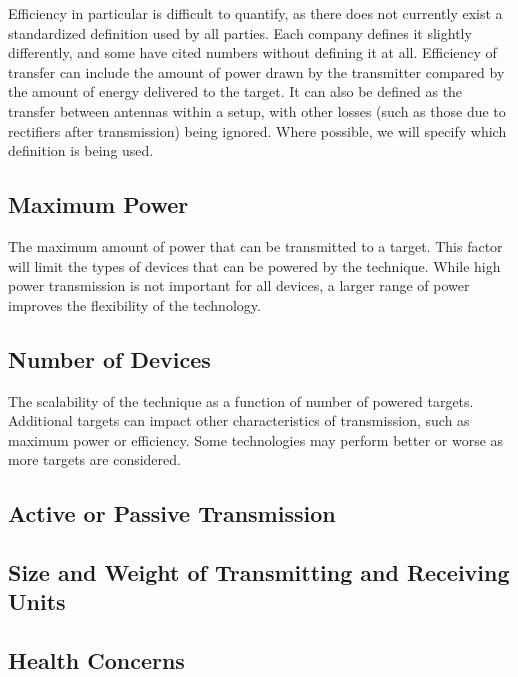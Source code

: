 Efficiency in particular is difficult to quantify, as there does not currently exist a standardized definition used by all parties. Each company defines it slightly differently, and some have cited numbers without defining it at all. Efficiency of transfer can include the amount of power drawn by the transmitter compared by the amount of energy delivered to the target.  It can also be defined as the transfer between antennas within a setup, with other losses (such as those due to rectifiers after transmission) being ignored. Where possible, we will specify which definition is being used.

\subsection{Maximum Power}

The maximum amount of power that can be transmitted to a target.  This factor will limit the types of devices that can be powered by the technique. While high power transmission is not important for all devices, a larger range of power improves the flexibility of the technology.

\subsection{Number of Devices}

The scalability of the technique as a function of number of powered targets.  Additional targets can impact other characteristics of transmission, such as maximum power or efficiency.  Some technologies may perform better or worse as more targets are considered.

\subsection{Active or Passive Transmission}


\subsection{Size and Weight of Transmitting and Receiving Units}


\subsection{Health Concerns}


